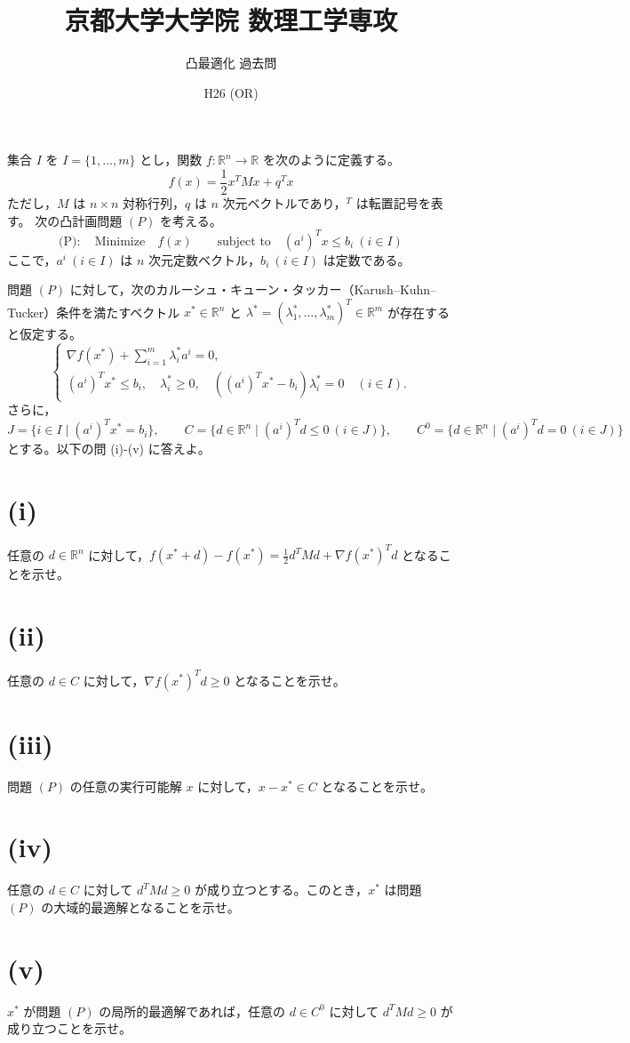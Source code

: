 \documentclass[12pt,a4paper]{article}
\title{京都大学大学院 数理工学専攻}
\author{凸最適化 過去問}
\date{H26 (OR)}
\begin{document}
\maketitle

集合 $I$ を $I=\{1,\dots,m\}$ とし，関数 $f:\mathbb{R}^n \to \mathbb{R}$ を次のように定義する。
\[
f(x)=\frac12 x^T M x + q^T x
\]
ただし，$M$ は $n\times n$ 対称行列，$q$ は $n$ 次元ベクトルであり，$^T$ は転置記号を表す。
次の凸計画問題 $(P)$ を考える。
\[
\text{(P)}:\quad \text{Minimize}\quad f(x) \qquad \text{subject to}\quad (a^i)^T x \le b_i \ (i\in I)
\]
ここで，$a^i\ (i\in I)$ は $n$ 次元定数ベクトル，$b_i\ (i\in I)$ は定数である。

問題 $(P)$ に対して，次のカルーシュ・キューン・タッカー（Karush--Kuhn--Tucker）条件を満たすベクトル
$x^*\in\mathbb{R}^n$ と $\lambda^*=(\lambda_1^*,\dots,\lambda_m^*)^T\in\mathbb{R}^m$ が存在すると仮定する。
\[
\begin{cases}
\nabla f(x^*) + \sum_{i=1}^m \lambda_i^* a^i = 0, \\
(a^i)^T x^* \le b_i, \quad \lambda_i^* \ge 0, \quad ((a^i)^T x^* - b_i)\lambda_i^* = 0 \quad (i\in I).
\end{cases}
\]
さらに，
\[
J=\{i\in I\mid (a^i)^T x^* = b_i\}, \qquad 
C=\{d\in\mathbb{R}^n\mid (a^i)^T d \le 0\ (i\in J)\}, \qquad 
C^0=\{d\in\mathbb{R}^n\mid (a^i)^T d = 0\ (i\in J)\}
\]
とする。以下の問 (i)-(v) に答えよ。

\section*{(i)}
任意の $d\in\mathbb{R}^n$ に対して，$f(x^*+d)-f(x^*) = \frac12 d^T M d + \nabla f(x^*)^T d$ となることを示せ。

\section*{(ii)}
任意の $d\in C$ に対して，$\nabla f(x^*)^T d \ge 0$ となることを示せ。

\section*{(iii)}
問題 $(P)$ の任意の実行可能解 $x$ に対して，$x-x^* \in C$ となることを示せ。

\section*{(iv)}
任意の $d\in C$ に対して $d^T M d \ge 0$ が成り立つとする。このとき，$x^*$ は問題 $(P)$ の大域的最適解となることを示せ。

\section*{(v)}
$x^*$ が問題 $(P)$ の局所的最適解であれば，任意の $d\in C^0$ に対して $d^T M d \ge 0$ が成り立つことを示せ。
\end{document}
